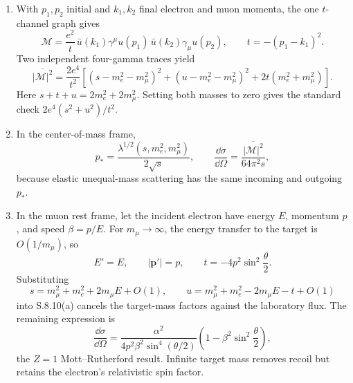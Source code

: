\begin{enumerate}
\begin{enumerate}
\item
With \(p_1,p_2\) initial and \(k_1,k_2\) final electron and muon momenta,
the one \(t\)-channel graph gives
\[
 \mathcal M=\frac{e^2}{t}\,
 \bar u(k_1)\gamma^\mu u(p_1)\,
 \bar u(k_2)\gamma_\mu u(p_2),
\qquad t=-(p_1-k_1)^2.
\]
Two independent four-gamma traces yield
\[
 \boxed{\;
 \overline{|\mathcal M|^2}
 =\frac{2e^4}{t^2}\left[
 (s-m_e^2-m_\mu^2)^2
 +(u-m_e^2-m_\mu^2)^2
 +2t(m_e^2+m_\mu^2)
 \right].\;}
\]
Here
\(s+t+u=2m_e^2+2m_\mu^2\).  Setting both masses to zero gives the
standard check \(2e^4(s^2+u^2)/t^2\).
\item
In the center-of-mass frame,
\[
 p_*=\frac{\lambda^{1/2}(s,m_e^2,m_\mu^2)}{2\sqrt s},
\qquad
 \frac{\dd\sigma}{\dd\Omega}
 =\frac{\overline{|\mathcal M|^2}}{64\pi^2s},
\]
because elastic unequal-mass scattering has the same incoming and
outgoing \(p_*\).
\item
In the muon rest frame, let the incident electron have energy \(E\),
momentum \(p\), and speed \(\beta=p/E\).  For \(m_\mu\to\infty\),
the energy transfer to the target is \(O(1/m_\mu)\), so
\[
 E'=E,\qquad |\mathbf p'|=p,\qquad
 t=-4p^2\sin^2\frac\theta2.
\]
Substituting
\[
 s=m_\mu^2+m_e^2+2m_\mu E+O(1),\qquad
 u=m_\mu^2+m_e^2-2m_\mu E-t+O(1)
\]
into S.8.10(a) cancels the target-mass factors against the laboratory flux.
The remaining expression is
\[
 \frac{\dd\sigma}{\dd\Omega}
 =\frac{\alpha^2}
 {4p^2\beta^2\sin^4(\theta/2)}
 \left(1-\beta^2\sin^2\frac\theta2\right),
\]
the \(Z=1\) Mott--Rutherford result.  Infinite target mass removes recoil
but retains the electron's relativistic spin factor.
\end{enumerate}


\end{enumerate}
